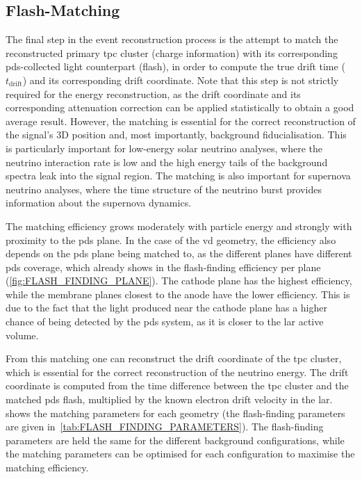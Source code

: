 \subsection{Flash-Matching}\label{sec:FLASH_MATCHING}
The final step in the event reconstruction process is the attempt to match the reconstructed primary \gls{tpc} cluster (charge information) with its corresponding \gls{pds}-collected light counterpart (flash), in order to compute the true drift time ($t_\text{drift}$) and its corresponding drift coordinate. Note that this step is not strictly required for the energy reconstruction, as the drift coordinate and its corresponding attenuation correction can be applied statistically to obtain a good average result. However, the matching is essential for the correct reconstruction of the signal's 3D position and, most importantly, background fiducialisation. This is particularly important for low-energy solar neutrino analyses, where the neutrino interaction rate is low and the high energy tails of the background spectra leak into the signal region. The matching is also important for supernova neutrino analyses, where the time structure of the neutrino burst provides information about the supernova dynamics. 

The matching efficiency grows moderately with particle energy and strongly with proximity to the \gls{pds} plane. In the case of the \gls{vd} geometry, the efficiency also depends on the \gls{pds} plane being matched to, as the different planes have different \gls{pds} coverage, which already shows in the flash-finding efficiency per plane (\cref{fig:FLASH_FINDING_PLANE}). The cathode plane has the highest efficiency, while the membrane planes closest to the anode have the lower efficiency. This is due to the fact that the light produced near the cathode plane has a higher chance of being detected by the \gls{pds} system, as it is closer to the \gls{lar} active volume.

\begin{table}[ht]
    \centering
    
    \caption{Flash-matching parameters for \gls{hd} and \gls{vd} geometries.\label{tab:FLASH_MATCHING_PARAMETERS}}
\end{table}

From this matching one can reconstruct the drift coordinate of the \gls{tpc} cluster, which is essential for the correct reconstruction of the neutrino energy. The drift coordinate is computed from the time difference between the \gls{tpc} cluster and the matched \gls{pds} flash, multiplied by the known electron drift velocity in the \gls{lar}.  shows the matching parameters for each geometry (the flash-finding parameters are given in~\cref{tab:FLASH_FINDING_PARAMETERS}). The flash-finding parameters are held the same for the different background configurations, while the matching parameters can be optimised for each configuration to maximise the matching efficiency.

